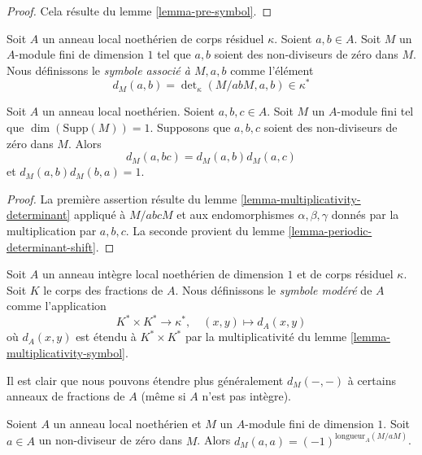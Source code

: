 \begin{proof}
Cela résulte du lemme \ref{lemma-pre-symbol}.
\end{proof}

\begin{definition}
\label{definition-symbol-M}
Soit $A$ un anneau local noethérien de corps résiduel $\kappa$.
Soient $a, b \in A$.
Soit $M$ un $A$-module fini de dimension $1$
tel que $a, b$ soient des non-diviseurs de zéro dans $M$.
Nous définissons le {\it symbole associé à $M, a, b$}
comme l'élément
$$
d_M(a, b) =
\det\nolimits_\kappa(M/abM, a, b) \in \kappa^*
$$
\end{definition}

\begin{lemma}
\label{lemma-multiplicativity-symbol}
Soit $A$ un anneau local noethérien.
Soient $a, b, c \in A$. Soit $M$ un $A$-module fini
tel que $\dim(\text{Supp}(M)) = 1$. Supposons que $a, b, c$ soient des non-diviseurs de zéro dans $M$.
Alors
$$
d_M(a, bc) = d_M(a, b) d_M(a, c)
$$
et $d_M(a, b)d_M(b, a) = 1$.
\end{lemma}

\begin{proof}
La première assertion résulte du lemme \ref{lemma-multiplicativity-determinant}
appliqué à $M/abcM$ et aux endomorphismes $\alpha, \beta, \gamma$ donnés par
la multiplication par $a, b, c$.
La seconde provient du lemme \ref{lemma-periodic-determinant-shift}.
\end{proof}

\begin{definition}
\label{definition-tame-symbol}
Soit $A$ un anneau intègre local noethérien de dimension $1$
et de corps résiduel $\kappa$.
Soit $K$ le corps des fractions de $A$.
Nous définissons le {\it symbole modéré} de $A$ comme l'application
$$
K^* \times K^* \longrightarrow \kappa^*,
\quad
(x, y) \longmapsto d_A(x, y)
$$
où $d_A(x, y)$ est étendu à $K^* \times K^*$ par la multiplicativité du
lemme \ref{lemma-multiplicativity-symbol}.
\end{definition}

\noindent
Il est clair que nous pouvons étendre plus généralement $d_M(-, -)$ à
certains anneaux de fractions de $A$ (même si $A$ n'est pas intègre).

\begin{lemma}
\label{lemma-symbol-when-equal}
Soient $A$ un anneau local noethérien et $M$ un $A$-module fini de
dimension $1$. Soit $a \in A$ un non-diviseur de zéro dans $M$.
Alors $d_M(a, a) = (-1)^{\text{longueur}_A(M/aM)}$.
\end{lemma}

